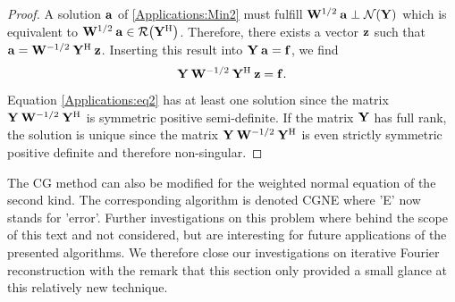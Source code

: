   \begin{proof}
    A solution $\mathbf{a}$ of \eqref{Applications:Min2} must fulfill $\mathbf{W}^{1/2}\:\mathbf{a} \perp \mathcal{N}{\hspace{-0.4ex}}\left(\mathbf{Y}\right)$ 
    which is equivalent to $\mathbf{W}^{1/2}\:\mathbf{a} \in \mathcal{R}{\hspace{-0.4ex}}\left(\mathbf{Y}^{\text{\rm{H}}}\right)$. Therefore, there exists a vector
    $\mathbf{z}$ such that $\mathbf{a} = \mathbf{W}^{-1/2}\:\mathbf{Y}^{\text{\rm{H}}}\: \mathbf{z}$. Inserting this result into $\mathbf{Y}\:\mathbf{a} = \mathbf{f}$, we find
    \begin{equation}
      \label{Applications:eq2}
      \mathbf{Y}\:\mathbf{W}^{-1/2}\:\mathbf{Y}^{\text{\rm{H}}}\: \mathbf{z} = \mathbf{f}.
    \end{equation}
    Equation \eqref{Applications:eq2} has at least one solution since the matrix $\mathbf{Y}\:\mathbf{W}^{-1/2}\:\mathbf{Y}^{\text{\rm{H}}}$
    is symmetric positive semi-definite. If the matrix $\mathbf{Y}$ has full rank, the solution is unique 
    since the matrix $\mathbf{Y}\:\mathbf{W}^{-1/2}\:\mathbf{Y}^{\text{\rm{H}}}$ is even strictly symmetric positive definite
    and therefore non-singular.
  \end{proof}
  
  The CG method can also be modified for the weighted normal equation of the second kind. The corresponding 
  algorithm is denoted CGNE where 'E' now stands for 'error'. Further investigations on this problem where 
  behind the scope of this text and not considered, but are interesting for future applications of the 
  presented algorithms. We therefore close our investigations on iterative Fourier reconstruction with the 
  remark that this section only provided a small glance at this relatively new technique.
